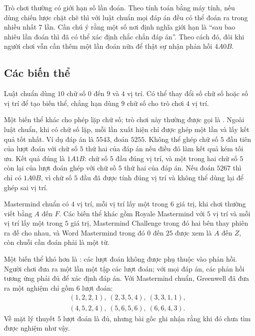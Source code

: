 \documentclass[11pt]{article}
\newcommand{\AB}[2]{#1A#2B}
\begin{document}
Trò chơi thường có giới hạn số lần đoán. Theo tính toán bằng máy tính, nếu
dùng chiến lược chặt chẽ thì với luật chuẩn mọi đáp án đều có thể đoán ra
trong nhiều nhất \(7\) lần. Cần chú ý rằng một số nơi định nghĩa giới hạn là
``sau bao nhiêu lần đoán thì đã có thể xác định chắc chắn đáp án''. Theo cách
đó, đôi khi người chơi vẫn cần thêm một lần đoán nữa để thật sự nhận phản hồi
\(\AB{4}{0}\).

\subsection{Các biến thể}

Luật chuẩn dùng \(10\) chữ số \(0\) đến \(9\) và \(4\) vị trí. Có thể thay đổi
số chữ số hoặc số vị trí để tạo biến thể, chẳng hạn dùng \(9\) chữ số cho trò
chơi \(4\) vị trí.

Một biến thể khác cho phép lặp chữ số; trò chơi này thường được gọi là
. Ngoài luật chuẩn, khi có chữ số lặp, mỗi lần xuất hiện chỉ
được ghép một lần và lấy kết quả tốt nhất. Ví dụ đáp án là \(5543\), đoán
\(5255\). Không thể ghép chữ số \(5\) đầu tiên của lượt đoán với chữ số \(5\)
thứ hai của đáp án nếu điều đó làm kết quả kém tối ưu. Kết quả đúng là
\(\AB{1}{1}\): chữ số \(5\) đầu đúng vị trí, và một trong hai chữ số \(5\) còn
lại của lượt đoán ghép với chữ số \(5\) thứ hai của đáp án. Nếu đoán \(5267\)
thì chỉ có \(\AB{1}{0}\), vì chữ số \(5\) đầu đã được tính đúng vị trí và
không thể dùng lại để ghép sai vị trí.

Mastermind chuẩn có \(4\) vị trí, mỗi vị trí lấy một trong \(6\) giá trị, khi
chơi thường viết bằng \(A\) đến \(F\). Các biến thể khác gồm Royale
Mastermind với \(5\) vị trí và mỗi vị trí lấy một trong \(5\) giá trị,
Mastermind Challenge trong đó hai bên thay phiên ra đề cho nhau, và Word
Mastermind trong đó \(0\) đến \(25\) được xem là \(A\) đến \(Z\), còn chuỗi
cần đoán phải là một từ.

Một biến thể khó hơn là : các lượt đoán không được phụ thuộc
vào phản hồi. Người chơi đưa ra một lần một tập các lượt đoán; với mọi đáp án,
các phản hồi tương ứng phải đủ để xác định đáp án. Với Mastermind chuẩn,
Greenwell đã đưa ra một nghiệm chỉ gồm \(6\) lượt đoán:
\[
\begin{gathered}
(1,2,2,1),\ (2,3,5,4),\ (3,3,1,1),\\
(4,5,2,4),\ (5,6,5,6),\ (6,6,4,3).
\end{gathered}
\]
Về mặt lý thuyết \(5\) lượt đoán là đủ, nhưng bài gốc ghi nhận rằng khi đó
chưa tìm được nghiệm như vậy.
\end{document}
